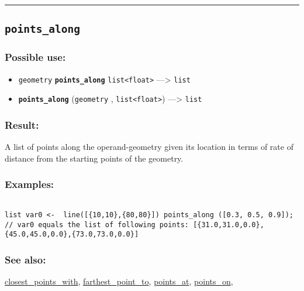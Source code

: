 \documentclass[]{book}
\providecommand{\tightlist}{%
  \setlength{\itemsep}{0pt}\setlength{\parskip}{0pt}}
\theoremstyle{definition}
\theoremstyle{definition}
\theoremstyle{definition}
\theoremstyle{remark}
\begin{document}
\begin{center}\rule{0.5\linewidth}{\linethickness}\end{center}

\subsection{\texorpdfstring{\texttt{points\_along}}{points\_along}}\label{points_along}

\subsubsection{Possible use:}\label{possible-use-409}

\begin{itemize}
\tightlist
\item
  \texttt{geometry} \textbf{\texttt{points\_along}}
  \texttt{list\textless{}float\textgreater{}} ---\textgreater{}
  \texttt{list}
\item
  \textbf{\texttt{points\_along}} (\texttt{geometry} ,
  \texttt{list\textless{}float\textgreater{}}) ---\textgreater{}
  \texttt{list}
\end{itemize}

\subsubsection{Result:}\label{result-395}

A list of points along the operand-geometry given its location in terms
of rate of distance from the starting points of the geometry.

\subsubsection{Examples:}\label{examples-283}

\begin{verbatim}
 
list var0 <-  line([{10,10},{80,80}]) points_along ([0.3, 0.5, 0.9]); // var0 equals the list of following points: [{31.0,31.0,0.0},{45.0,45.0,0.0},{73.0,73.0,0.0}]
\end{verbatim}

\subsubsection{See also:}\label{see-also-162}

\href{operators-b-to-c.html\#closest_points_with}{closest\_points\_with},
\href{operators-d-to-h.html\#farthest_point_to}{farthest\_point\_to},
\href{operators-n-to-r.html\#points_at}{points\_at},
\href{operators-n-to-r.html\#points_on}{points\_on},
\end{document}
